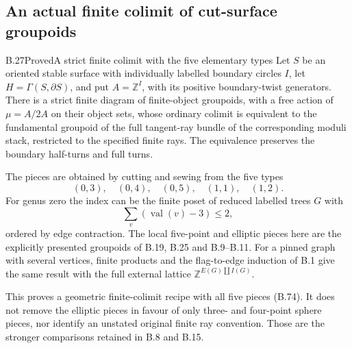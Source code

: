 
\subsection{An actual finite colimit of cut-surface groupoids}

\begin{result}{B.27}{Proved}{A strict finite colimit with the five elementary types}
Let $S$ be an oriented stable surface with individually labelled
boundary circles $I$, let $H=\Gamma(S,\partial S)$, and put
$A=\mathbb Z^I$, with its positive boundary-twist generators.
There is a strict finite diagram of finite-object groupoids,
with a free action of $\mu=A/2A$ on their object sets, whose
ordinary colimit is equivalent to the fundamental groupoid of
the full tangent-ray bundle of the corresponding moduli stack,
restricted to the specified finite rays.  The equivalence
preserves the boundary half-turns and full turns.

The pieces are obtained by cutting and sewing from the five
types
\[
 (0,3),\quad(0,4),\quad(0,5),\quad(1,1),\quad(1,2). \tag{B.74}
\]
For genus zero the index can be the finite poset of reduced
labelled trees $G$ with
\[
 \sum_v(\operatorname{val}(v)-3)\leq2,
\]
ordered by edge contraction.  The local five-point and elliptic
pieces here are the explicitly presented groupoids of B.19,
B.25 and B.9--B.11.  For a pinned graph with several vertices,
finite products and the flag-to-edge induction of B.1 give the
same result with the full external lattice
$\mathbb Z^{E(G)\amalg I(G)}$.

This proves a geometric finite-colimit recipe with all five
pieces (B.74).  It does not remove the elliptic pieces in favour
of only three- and four-point sphere pieces, nor identify an
unstated original finite ray convention.  Those are the stronger
comparisons retained in B.8 and B.15.
\end{result}
